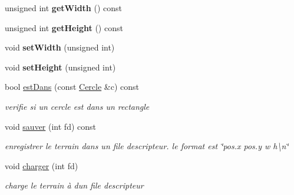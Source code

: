\begin{DoxyCompactItemize}
unsigned int {\bfseries get\+Width} () const
\item 
\mbox{\label{class_rectangle_a5bfb002e7628599a47ad4fad1b4fd3c1}} 
unsigned int {\bfseries get\+Height} () const
\item 
\mbox{\label{class_rectangle_a65135fe30f29ad6893695e13cee0658c}} 
void {\bfseries set\+Width} (unsigned int)
\item 
\mbox{\label{class_rectangle_aa293da261bdf9580f80c349c772648b1}} 
void {\bfseries set\+Height} (unsigned int)
\item 
\mbox{\label{class_rectangle_ae8bf56fea5536645968d0e66aa8da2b7}} 
bool \mbox{\hyperlink{class_rectangle_ae8bf56fea5536645968d0e66aa8da2b7}{est\+Dans}} (const \mbox{\hyperlink{class_cercle}{Cercle}} \&c) const
\begin{DoxyCompactList}\small\item\em verifie si un cercle est dans un rectangle \end{DoxyCompactList}\item 
\mbox{\label{class_rectangle_a8e790c85174f9706bbb4be5255a98e42}} 
void \mbox{\hyperlink{class_rectangle_a8e790c85174f9706bbb4be5255a98e42}{sauver}} (int fd) const
\begin{DoxyCompactList}\small\item\em enregistrer le terrain dans un file descripteur. le format est \char`\"{}pos.\+x\textquotesingle{} \textquotesingle{}pos.\+y\textquotesingle{} \textquotesingle{}w\textquotesingle{} \textquotesingle{}h\textquotesingle{}\textbackslash{}n\textquotesingle{}\char`\"{} \end{DoxyCompactList}\item 
\mbox{\label{class_rectangle_ae4e6d7f9ff84af1a7c11b62bff7c31b5}} 
void \mbox{\hyperlink{class_rectangle_ae4e6d7f9ff84af1a7c11b62bff7c31b5}{charger}} (int fd)
\begin{DoxyCompactList}\small\item\em charge le terrain à d\textquotesingle{}un file descripteur \end{DoxyCompactList}\end{DoxyCompactItemize}
